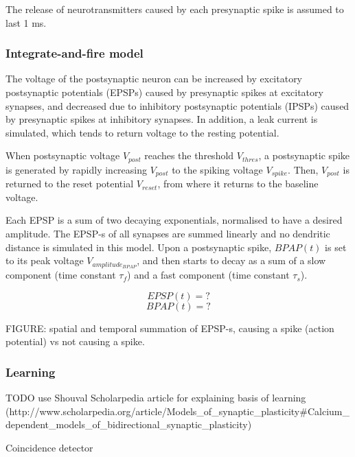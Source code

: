 \documentclass[a4paper,12pt]{report}
\theoremstyle{definition}
\begin{document}
The release of neurotransmitters caused by each presynaptic spike is assumed to last 1 ms.

\subsubsection{Integrate-and-fire model}

The voltage of the postsynaptic neuron can be increased by excitatory postsynaptic potentials (EPSPs) caused by presynaptic spikes at excitatory synapses, and decreased due to inhibitory postsynaptic potentials (IPSPs) caused by presynaptic spikes at inhibitory synapses. In addition, a leak current is simulated, which tends to return voltage to the resting potential.

When postsynaptic voltage $V_{post}$ reaches the threshold $V_{thres}$, a postsynaptic spike is generated by rapidly increasing $V_{post}$ to the spiking voltage $V_{spike}$. Then, $V_{post}$ is returned to the reset potential $V_{reset}$, from where it returns to the baseline voltage.

Each EPSP is a sum of two decaying exponentials, normalised to have a desired amplitude. The EPSP-s of all synapses are summed linearly and no dendritic distance is simulated in this model. Upon a postsynaptic spike, $BPAP(t)$ is set to its peak voltage $V_{amplitude_{BPAP}}$, and then starts to decay as a sum of a slow component (time constant $\tau_f$) and a fast component (time constant $\tau_s$).

$$ EPSP(t) = ? $$
$$ BPAP(t) = ? $$

FIGURE: spatial and temporal summation of EPSP-s, causing a spike (action potential) vs not causing a spike.



\subsubsection{Learning}


TODO use Shouval Scholarpedia article for explaining basis of learning (http://www.scholarpedia.org/article/Models_of_synaptic_plasticity#Calcium_dependent_models_of_bidirectional_synaptic_plasticity)

Coincidence detector

\end{document}
